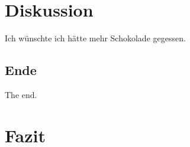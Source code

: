 \section{Diskussion}
Ich wünschte ich hätte mehr Schokolade gegessen. 

\subsection{Ende}
The end.

\section{Fazit}
